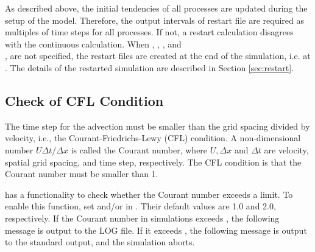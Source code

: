 As described above, the initial tendencies of all processes are updated during the setup of the model.
Therefore, the output intervals of restart file are required as multiples of time steps for all processes.
If not, a restart calculation disagrees with the continuous calculation.
When , ,  , and\\ , are not specified,
the restart files are created at the end of the simulation, i.e. at .
The details of the restarted simulation are described in Section \ref{sec:restart}.



\subsection{Check of CFL Condition} \label{subsec:cfl_check}

The time step for the advection  must be smaller than the grid spacing divided by velocity, i.e., the Courant-Friedrichs-Lewy (CFL) condition.
A non-dimensional number $U \Delta t/\Delta x$ is called the Courant number, where $U, \Delta x$ and $\Delta t$ are velocity, spatial grid spacing, and time step, respectively.
The CFL condition is that the Courant number must be smaller than 1.

\scalerm has a functionality to check whether the Courant number exceeds a limit.
To enable this function, set  and/or  in .
Their default values are 1.0 and 2.0, respectively.
If the Courant number in simulations exceeds , the following message is output to the LOG file.
If it exceeds , the following message is output to the standard output, and the simulation aborts.

